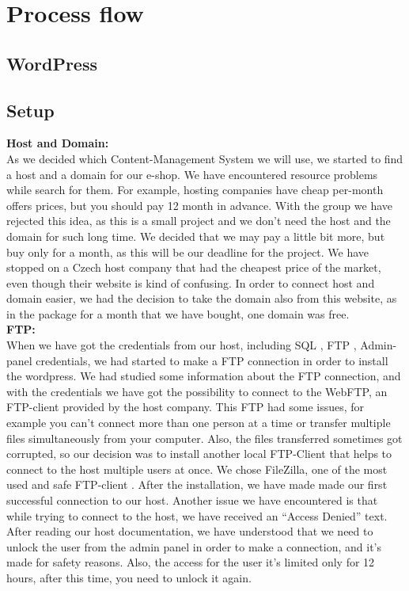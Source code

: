 \documentclass[12p]{article}
\begin{document}
\newpage


\newpage
\section{Process flow}

\subsection{WordPress}

\subsection{Setup}
\textbf{Host and Domain:}
\\
As we decided which Content-Management System we will use, we started to find a host and a domain for our e-shop. We have encountered resource problems while search for them. For example, hosting companies have cheap per-month offers prices, but you should pay 12 month in advance. With the group we have rejected this idea, as this is a small project and we don’t need the host and the domain for such long time. We decided that we may pay a little bit more, but buy only for a month, as this will be our deadline for the project. We have stopped on a Czech host company that had the cheapest price of the market, even though their website is kind of confusing. In order to connect host and domain easier, we had the decision to take the domain also from this website, as in the package for a month that we have  bought, one domain was free. \\

\textbf{FTP:}
\\
When we have got the credentials from our host, including SQL \cite{mySQL}, FTP \cite{FTP}, Admin-panel credentials, we had started to make a FTP connection in order to install the wordpress. We had studied some information about the FTP connection, and with the credentials we have got the possibility to connect to the WebFTP, an FTP-client provided by the host company. This FTP had some issues, for example you can’t connect more than one person at a time or transfer multiple files simultaneously from your computer. Also, the files transferred sometimes got corrupted, so our decision was to install another local FTP-Client that helps to connect to the host multiple users at once. We chose FileZilla, one of the most used and safe FTP-client \cite{FileZilla}. After the installation, we have made made our first successful connection to our host. Another issue we have encountered is that while trying to connect to the host, we have received an “Access Denied” text. After reading our host documentation, we have understood that we need to unlock the user from the admin panel in order to make a connection, and it’s made for safety reasons. Also, the access for the user it’s limited only for 12 hours, after this time, you need to unlock it again. \\
\end{document}
